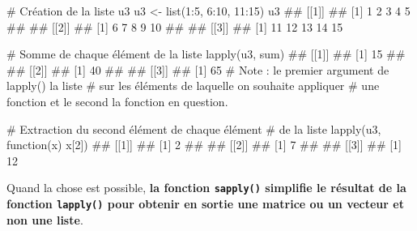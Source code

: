 \documentclass[12pt,twosided, notitlepage]{book}
\newenvironment{Shaded}{}{}
\newcommand{\KeywordTok}[1]{\textcolor[rgb]{0.00,0.00,1.00}{#1}}
\newcommand{\DecValTok}[1]{#1}
\newcommand{\StringTok}[1]{\textcolor[rgb]{0.00,0.50,0.50}{#1}}
\newcommand{\CommentTok}[1]{\textcolor[rgb]{0.00,0.50,0.00}{#1}}
\newcommand{\ControlFlowTok}[1]{\textcolor[rgb]{0.00,0.00,1.00}{#1}}
\newcommand{\OperatorTok}[1]{#1}
\newcommand{\NormalTok}[1]{#1}
\renewenvironment{Shaded}{\begin{snugshade}}{\end{snugshade}}
\begin{document}
\begin{Shaded}
\begin{Highlighting}[]
\CommentTok{# Création de la liste u3}
\NormalTok{u3 <-}\StringTok{ }\KeywordTok{list}\NormalTok{(}\DecValTok{1}\OperatorTok{:}\DecValTok{5}\NormalTok{, }\DecValTok{6}\OperatorTok{:}\DecValTok{10}\NormalTok{, }\DecValTok{11}\OperatorTok{:}\DecValTok{15}\NormalTok{)}
\NormalTok{u3}
\NormalTok{  ## [[1]]}
\NormalTok{  ## [1] 1 2 3 4 5}
\NormalTok{  ## }
\NormalTok{  ## [[2]]}
\NormalTok{  ## [1]  6  7  8  9 10}
\NormalTok{  ## }
\NormalTok{  ## [[3]]}
\NormalTok{  ## [1] 11 12 13 14 15}

\CommentTok{# Somme de chaque élément de la liste}
\KeywordTok{lapply}\NormalTok{(u3, sum)}
\NormalTok{  ## [[1]]}
\NormalTok{  ## [1] 15}
\NormalTok{  ## }
\NormalTok{  ## [[2]]}
\NormalTok{  ## [1] 40}
\NormalTok{  ## }
\NormalTok{  ## [[3]]}
\NormalTok{  ## [1] 65}
\CommentTok{# Note : le premier argument de lapply() la liste}
\CommentTok{# sur les éléments de laquelle on souhaite appliquer}
\CommentTok{# une fonction et le second la fonction en question.}

\CommentTok{# Extraction du second élément de chaque élément}
\CommentTok{# de la liste}
\KeywordTok{lapply}\NormalTok{(u3, }\ControlFlowTok{function}\NormalTok{(x) x[}\DecValTok{2}\NormalTok{])}
\NormalTok{  ## [[1]]}
\NormalTok{  ## [1] 2}
\NormalTok{  ## }
\NormalTok{  ## [[2]]}
\NormalTok{  ## [1] 7}
\NormalTok{  ## }
\NormalTok{  ## [[3]]}
\NormalTok{  ## [1] 12}
\end{Highlighting}
\end{Shaded}

Quand la chose est possible, \textbf{la fonction \texttt{sapply()}
simplifie le résultat de la fonction \texttt{lapply()} pour obtenir en
sortie une matrice ou un vecteur et non une
liste}.
\end{document}
